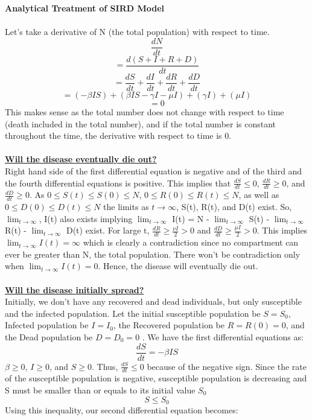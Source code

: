 \documentclass[11pt]{article}
\theoremstyle{definition}
\begin{document}
{\textbf{\large Analytical Treatment of SIRD Model}}\\
\\
Let's take a derivative of N (the total population) with respect to time.
$$\frac{dN}{dt}$$
$$=\frac{d(S+I+R+D)}{dt}$$
$$=\frac{dS}{dt}+\frac{dI}{dt}+\frac{dR}{dt}+\frac{dD}{dt}$$
$$=(-\beta IS) + (\beta IS -\gamma I -\mu I) +(\gamma I) + (\mu I)$$
$$=0$$
This makes sense as the total number does not change with respect to time (death included in the total number), and if the total number is constant throughout the time, the derivative with respect to time is 0.\\
\\
\textbf{\underline{Will the disease eventually die out?}}\\
Right hand side of the first differential equation is negative and of the third and the fourth differential equations is positive. This implies that $\frac{dS}{dt}\leq 0$, $\frac{dR}{dt}\geq 0$, and $\frac{dD}{dt}\geq 0$. As $0 \leq S(t) \leq S(0) \leq N$, $0 \leq R(0) \leq R(t) \leq N$, as well as $0 \leq D(0) \leq D(t) \leq N$ the limits as $t\rightarrow \infty$, S(t), R(t), and D(t) exist. So, $\lim_{t\to\infty}$, I(t) also exists implying $\lim_{t\to\infty}$ I(t) = N - $\lim_{t\to\infty}$ S(t) - $\lim_{t\to\infty}$ R(t) - $\lim_{t\to\infty}$ D(t) exist. For large t, $\frac{dR}{dt}\geq \frac{\nu I}{2} > 0$ and $\frac{dD}{dt}\geq \frac{\mu I}{2} > 0$. This implies $\lim_{t\to\infty} I(t) = \infty$ which is clearly a contradiction since no compartment can ever be greater than N, the total population. There won't be contradiction only when $\lim_{t\to\infty} I(t) = 0$. Hence, the disease will eventually die out.\\
\\
\textbf{\underline{Will the disease initially spread?}}\\
Initially, we don't have any recovered and dead individuals, but only susceptible and the infected population. Let the initial susceptible population be $S = S_{0}$, Infected population be $I = I_{0}$, the Recovered population be $R = R(0) = 0$, and the Dead population be $D = D_{0} = 0$ . We have the first differential equations as:
$$\frac{dS}{dt}=-\beta IS$$
$\beta \geq  0$, $I \geq  0$, and $S \geq  0$. Thus, $\frac{dS}{dt} \leq 0$ because of the negative sign. Since the rate of the susceptible population is negative, susceptible population is decreasing and S must be smaller than or equals to its initial value $S_{0}$
$$S \leq S_{0}$$
Using this inequality, our second differential equation becomes:
\end{document}
